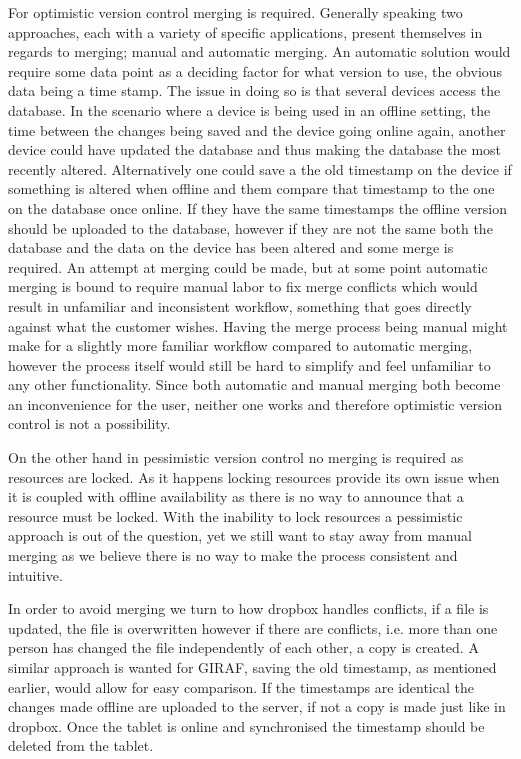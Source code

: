 For optimistic version control merging is required. 
Generally speaking two approaches, each with a variety of specific applications, present themselves in regards to merging; manual and automatic merging.
An automatic solution would require some data point as a deciding factor for what version to use, the obvious data being a time stamp.
The issue in doing so is that several devices access the database.
In the scenario where a device is being used in an offline setting, the time between the changes being saved and the device going online again, another device could have updated the database and thus making the database the most recently altered.
Alternatively one could save a the old timestamp on the device if something is altered when offline and them compare that timestamp to the one on the database once online. 
If they have the same timestamps the offline version should be uploaded to the database, however if they are not the same both the database and the data on the device has been altered and some merge is required.
An attempt at merging could be made, but at some point automatic merging is bound to require manual labor to fix merge conflicts which would result in unfamiliar and inconsistent workflow, something that goes directly against what the customer wishes.
Having the merge process being manual might make for a slightly more familiar workflow compared to automatic merging, however the process itself would still be hard to simplify and feel unfamiliar to any other functionality.
Since both automatic and manual merging both become an inconvenience for the user, neither one works and therefore optimistic version control is not a possibility.

\bigskip
On the other hand in pessimistic version control no merging is required as resources are locked.
As it happens locking resources provide its own issue when it is coupled with offline availability as there is no way to announce that a resource must be locked.
With the inability to lock resources a pessimistic approach is out of the question, yet we still want to stay away from manual merging as we believe there is no way to make the process consistent and intuitive.

In order to avoid merging we turn to how dropbox handles conflicts, if a file is updated, the file is overwritten however if there are conflicts, i.e. more than one person has changed the file independently of each other, a copy is created.
A similar approach is wanted for GIRAF, saving the old timestamp, as mentioned earlier, would allow for easy comparison.
If the timestamps are identical the changes made offline are uploaded to the server, if not a copy is made just like in dropbox.
Once the tablet is online and synchronised the timestamp should be deleted from the tablet.

